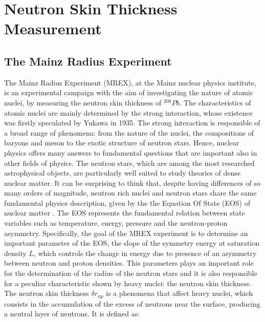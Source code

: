 
\chapter{Neutron Skin Thickness Measurement} \label{intro}

\section{The Mainz Radius Experiment}

The Mainz Radius Experiment (MREX), at the Mainz nuclear physics institute, is an experimental campaign with the aim of investigating the nature of atomic nuclei, by measuring the neutron skin thickness of $^{208}Pb$. The characteristics of atomic nuclei are mainly determined by the strong interaction, whose existence was firstly speculated by Yukawa in 1935. The strong interaction is responsible of a broad range of phenomena: from the nature of the nuclei, the compositions of baryons and meson to the exotic structure of neutron stars. Hence, nuclear physics offers many answers to fundamental questions that are important also in other fields of physics. The neutron stars, which are among the most researched astrophysical objects, are particularly well suited to study theories of dense nuclear matter. It can be surprising to think that, despite having differences of so many orders of magnitude, neutron rich nuclei and neutron stars share the same fundamental physics description, given by the the Equation Of State (EOS) of nuclear matter \cite{Thiel_2019}. The EOS represents the fundamental relation between state variables such as temperature, energy, pressure and the neutron-proton asymmetry. Specifically, the goal of the MREX experiment is to determine an important parameter of the EOS, the slope of the symmetry energy at saturation density $L$, which controls the change in energy due to presence of an asymmetry between neutron and proton densities. This parameters plays an important role for the determination of the radius of the neutron stars and it is also responsible for a peculiar characteristic shown by heavy nuclei: the neutron skin thickness. The neutron skin thickness $\delta r_{np}$ is a phenomena that affect heavy nuclei, which consists in the accumulation of the excess of neutrons near the surface, producing a neutral layer of neutrons. It is defined as: 

